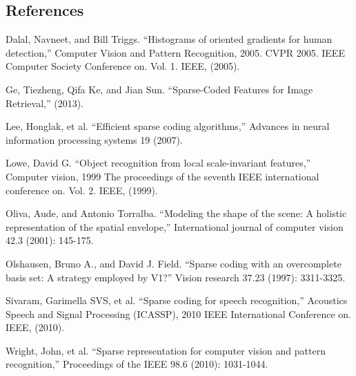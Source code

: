 \documentclass[letterpaper]{article}
\begin{document}
\subsection{References}
Dalal, Navneet, and Bill Triggs. ``Histograms of oriented gradients for human detection,'' Computer Vision and Pattern Recognition, 2005. CVPR 2005. IEEE Computer Society Conference on. Vol. 1. IEEE, (2005).

\smallskip \noindent
Ge, Tiezheng, Qifa Ke, and Jian Sun. ``Sparse-Coded Features for Image Retrieval,'' (2013).

\smallskip \noindent
Lee, Honglak, et al. ``Efficient sparse coding algorithms,'' Advances in neural information processing systems 19 (2007).

\smallskip \noindent
Lowe, David G. ``Object recognition from local scale-invariant features,'' Computer vision, 1999 The proceedings of the seventh IEEE international conference on. Vol. 2. IEEE, (1999).

\smallskip \noindent
Oliva, Aude, and Antonio Torralba. ``Modeling the shape of the scene: A holistic representation of the spatial envelope,'' International journal of computer vision 42.3 (2001): 145-175.

\smallskip \noindent
Olshausen, Bruno A., and David J. Field. ``Sparse coding with an overcomplete basis set: A strategy employed by V1?'' Vision research 37.23 (1997): 3311-3325.

\smallskip \noindent
Sivaram, Garimella SVS, et al. ``Sparse coding for speech recognition,'' Acoustics Speech and Signal Processing (ICASSP), 2010 IEEE International Conference on. IEEE, (2010).

\smallskip \noindent
Wright, John, et al. ``Sparse representation for computer vision and pattern recognition,'' Proceedings of the IEEE 98.6 (2010): 1031-1044.

%
\end{document}

